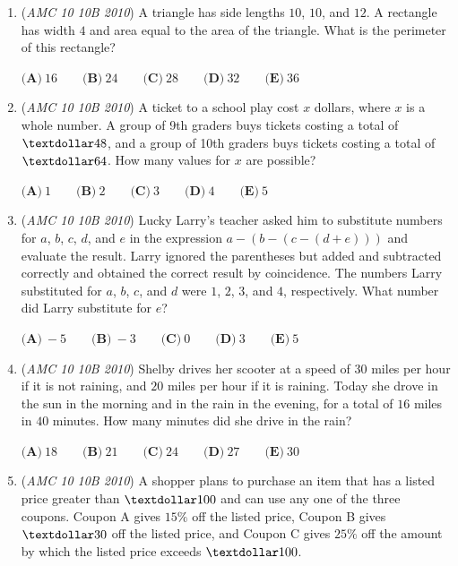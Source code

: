 \begin{enumerate}
 $\textbf{(A)}\ 20 \qquad \textbf{(B)}\ 25 \qquad \textbf{(C)}\ 45 \qquad \textbf{(D)}\ 50 \qquad \textbf{(E)}\ 65$


	\item (\textit{AMC 10 10B 2010}) A triangle has side lengths $10$, $10$, and $12$. A rectangle has width $4$ and area equal to the
area of the triangle. What is the perimeter of this rectangle?


 $\textbf{(A)}\ 16 \qquad \textbf{(B)}\ 24 \qquad \textbf{(C)}\ 28 \qquad \textbf{(D)}\ 32 \qquad \textbf{(E)}\ 36$


	\item (\textit{AMC 10 10B 2010}) A ticket to a school play cost $x$ dollars, where $x$ is a whole number. A group of 9th graders buys tickets costing a total of $\textdollar 48$, and a group of 10th graders buys tickets costing a total of $\textdollar 64$. How many values for $x$ are possible?


 $\textbf{(A)}\ 1 \qquad \textbf{(B)}\ 2 \qquad \textbf{(C)}\ 3 \qquad \textbf{(D)}\ 4 \qquad \textbf{(E)}\ 5$


	\item (\textit{AMC 10 10B 2010}) Lucky Larry's teacher asked him to substitute numbers for $a$, $b$, $c$, $d$, and $e$ in the expression $a-(b-(c-(d+e)))$ and evaluate the result. Larry ignored the parentheses but added and subtracted correctly and obtained the correct result by coincidence. The numbers Larry substituted for $a$, $b$, $c$, and $d$ were $1$, $2$, $3$, and $4$, respectively. What number did Larry substitute for $e$?


 $\textbf{(A)}\ -5 \qquad \textbf{(B)}\ -3 \qquad \textbf{(C)}\ 0 \qquad \textbf{(D)}\ 3 \qquad \textbf{(E)}\ 5$


	\item (\textit{AMC 10 10B 2010}) Shelby drives her scooter at a speed of $30$ miles per hour if it is not raining, and $20$ miles per hour if it is raining. Today she drove in the sun in the morning and in the rain in the evening, for a total of $16$ miles in $40$ minutes. How many minutes did she drive in the rain?


 $\textbf{(A)}\ 18 \qquad \textbf{(B)}\ 21 \qquad \textbf{(C)}\ 24 \qquad \textbf{(D)}\ 27 \qquad \textbf{(E)}\ 30$


	\item (\textit{AMC 10 10B 2010}) A shopper plans to purchase an item that has a listed price greater than $\textdollar 100$ and can use any one of the three coupons. Coupon A gives $15\%$ off the listed price, Coupon B gives $\textdollar 30$ off the listed price, and Coupon C gives $25\%$ off the amount by which the listed price exceeds
$\textdollar 100$. 


\end{enumerate}
